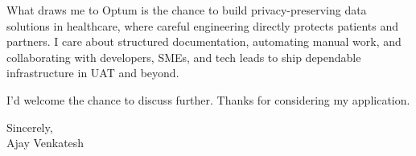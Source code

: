 \documentclass[letterpaper,11pt]{article}
\begin{document}
What draws me to Optum is the chance to build privacy-preserving data solutions in healthcare, where careful engineering directly protects patients and partners. I care about structured documentation, automating manual work, and collaborating with developers, SMEs, and tech leads to ship dependable infrastructure in UAT and beyond.

I'd welcome the chance to discuss further. Thanks for considering my application.

\vspace{12pt}
Sincerely, \\
Ajay Venkatesh
\end{document}

